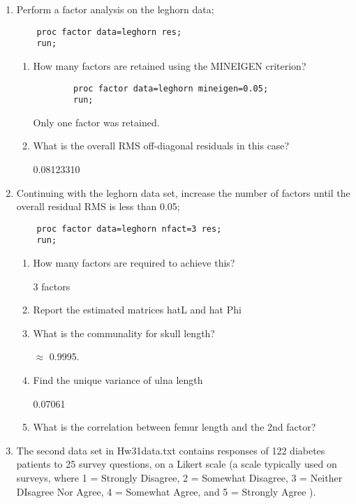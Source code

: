 \documentclass[11pt]{article}
\begin{document}
\begin{enumerate}
\item  Perform a factor analysis on the leghorn data;

\begin{Verbatim}
	proc factor data=leghorn res;
	run;
\end{Verbatim}

	\begin{enumerate}
	\item 
	How many factors are retained using the MINEIGEN criterion?
\begin{Verbatim}
		proc factor data=leghorn mineigen=0.05;
		run;
\end{Verbatim}
		Only one factor was retained. 
		

	\item 
	What is the overall RMS off-diagonal residuals in this case?

	0.08123310

	\end{enumerate}

\item Continuing with the leghorn data set, increase the number of factors 
	until the overall residual RMS is less than 0.05;

\begin{Verbatim}
	proc factor data=leghorn nfact=3 res;
	run;
\end{Verbatim}
	

	\begin{enumerate}
	\item How many factors are required to achieve this?

		3 factors

	\item Report the estimated matrices hatL and hat Phi

		

	\item What is the communality for skull length?

		$\approx$ 0.9995. 

	\item Find the unique variance of ulna length

		0.07061

	\item What is the correlation between femur length and the 2nd factor?

	\end{enumerate}

\item The second data set in Hw31data.txt contains responses of 122 
	diabetes patients to 25 survey questions, on a Likert scale 
	(a scale typically used on surveys, where 
		1 = Strongly Disagree, 
		2 = Somewhat Disagree, 
		3 = Neither DIsagree Nor Agree, 
		4 = Somewhat Agree, and 
		5 = Strongly Agree
	). 


\end{enumerate}
\end{document}
